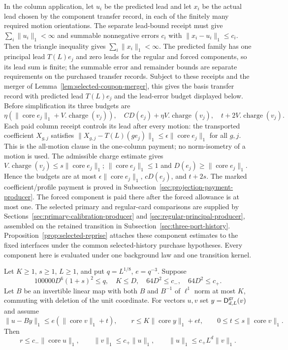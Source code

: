 In the column application, let $u_i$ be the predicted lead and let $x_i$
be the actual lead chosen by the component transfer record, in each of the finitely
many required motion orientations. The separate lead-bound receipt must give
$\sum_i\|u_i\|_1<\infty$ and summable nonnegative errors
$c_i$ with $\|x_i-u_i\|_1\le c_i$. Then the triangle inequality gives
$\sum_i\|x_i\|_1<\infty$. The predicted family has one principal lead
$T(L)e_j$ and zero leads for the regular and forced components, so its
lead sum is finite; the summable error and remainder bounds are separate
requirements on the purchased transfer records. Subject to these receipts and the
merger of Lemma~\ref{lem:selected-coupon-merger}, this gives the basis transfer record with predicted lead
$T(L)e_j$ and the lead-error budget displayed below. Before simplification
its three budgets are
\[
 \eta(\|\operatorname{core}e_j\|_1+V.\operatorname{charge}(v_j)),\quad
 C D(e_j)+\eta V.\operatorname{charge}(v_j),\quad
 t+2V.\operatorname{charge}(v_j).
\]
Each paid column receipt controls its lead after every motion: the transported
coefficient $X_{g,j}$ satisfies
$\|X_{g,j}-T(L)(g e_j)\|_1\le\epsilon\|\operatorname{core}e_j\|_1$
for all $g,j$. This is the all-motion clause in the one-column payment;
no norm-isometry of a motion is used. The admissible charge estimate gives
$V.\operatorname{charge}(v_j)\le s\|\operatorname{core}e_j\|_1$;
$\|\operatorname{core}e_j\|_1\le1$ and
$D(e_j)\ge\|\operatorname{core}e_j\|_1$. Hence the budgets are at most
$\epsilon\|\operatorname{core}e_j\|_1$, $cD(e_j)$, and $t+2s$.
The marked coefficient/profile payment is proved in
Subsection~\ref{sec:projection-payment-producer}. The forced component is
paid there after the forced allowance is at most one. The selected primary
and regular-card comparisons are supplied by
Sections~\ref{sec:primary-calibration-producer} and
\ref{sec:regular-principal-producer}, assembled on the retained transition
in Subsection~\ref{sec:three-port-history}. Proposition~\ref{prop:selected-reprise}
attaches these component estimates to the fixed interfaces under the common
selected-history purchase hypotheses. Every component here is evaluated under one
background law and one transition kernel.

\begin{lemma}
\label{lem:ex-selected-cone-step}
Let $K\ge1$, $s\ge1$, $L\ge1$, and put $q=L^{1/8}$,
$e=q^{-3}$. Suppose
\[
  100000D^6(1+s)^2\le q,\quad K\le D,
  \quad64D^2\le c_-,\quad64D^2\le c_+.
\]
Let $B$ be an invertible linear map with both $B$ and $B^{-1}$ of
$\ell^1$ norm at most $K$, commuting with deletion of the unit coordinate.
For vectors $u,v$ set $y=\mathsf D^{\rm gr}_{d,L}(v)$ and assume
\[
 \|u-By\|_1\le e(\|\operatorname{core}v\|_1+t),
 \qquad r\le K\|\operatorname{core}y\|_1+et,
 \qquad 0\le t\le s\|\operatorname{core}v\|_1.
\]
Then
\[
 r\le c_-\|\operatorname{core}u\|_1,\qquad
 \|v\|_1\le c_+\|u\|_1,\qquad
 \|u\|_1\le c_+L^d\|v\|_1.
\]
\end{lemma}

